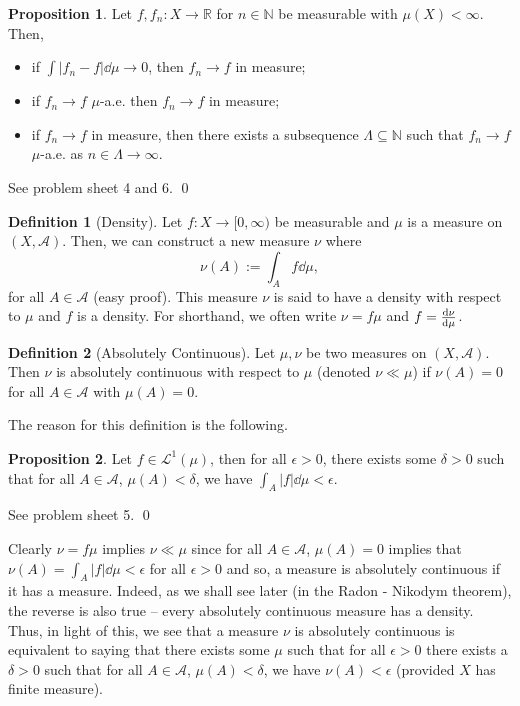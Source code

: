 \documentclass[
]{article}
\theoremstyle{definition}
\newtheorem{prop}{Proposition}
\theoremstyle{definition}
\newtheorem{definition}{Definition}[section]
\begin{document}
\begin{prop}
  Let \(f, f_n : X \to \mathbb{R}\) for \(n \in \mathbb{N}\) be measurable with 
  \(\mu(X) < \infty\). Then, 
  \begin{itemize}
    \item if \(\int |f_n - f| \dd \mu \to 0\), then \(f_n \to f\) in measure;
    \item if \(f_n \to f\) \(\mu\)-a.e. then \(f_n \to f\) in measure;
    \item if \(f_n \to f\) in measure, then there exists a subsequence 
    \(\Lambda \subseteq \mathbb{N}\) such that \(f_n \to f\) \(\mu\)-a.e. as 
    \(n \in \Lambda \to \infty\).
  \end{itemize}
\end{prop}
\proof

See problem sheet 4 and 6. \qed

\begin{definition}[Density]
  Let \(f : X \to [0, \infty)\) be measurable and \(\mu\) is a measure on 
  \((X, \mathcal{A})\). Then, we can construct a new measure \(\nu\) where 
  \[\nu(A) := \int_A f \dd \mu,\]
  for all \(A \in \mathcal{A}\) (easy proof). This measure \(\nu\) is said to have a 
  density with respect to \(\mu\) and \(f\) is a density. For shorthand, we often 
  write \(\nu = f \mu\) and \(f = \dv{\nu}{\mu}\).
\end{definition}

\begin{definition}[Absolutely Continuous]
  Let \(\mu, \nu\) be two measures on \((X, \mathcal{A})\). Then \(\nu\) is 
  absolutely continuous with respect to \(\mu\) (denoted \(\nu \ll \mu\)) if 
  \(\nu(A) = 0\) for all \(A \in \mathcal{A}\) with \(\mu(A) = 0\).
\end{definition}

The reason for this definition is the following.

\begin{prop}
  Let \(f \in \mathcal{L}^1(\mu)\), then for all \(\epsilon > 0\), there exists 
  some \(\delta > 0\) such that for all \(A \in \mathcal{A}\), \(\mu(A) < \delta\), 
  we have \(\int_A |f| \dd \mu < \epsilon\).
\end{prop}
\proof

See problem sheet 5. \qed

Clearly \(\nu = f\mu\) implies \(\nu \ll \mu\) since for all
\(A \in \mathcal{A}\), \(\mu(A) = 0\) implies that
\(\nu (A) = \int_A |f| \dd \mu < \epsilon\) for all \(\epsilon > 0\) and
so, a measure is absolutely continuous if it has a measure. Indeed, as
we shall see later (in the Radon - Nikodym theorem), the reverse is also
true -- every absolutely continuous measure has a density. Thus, in
light of this, we see that a measure \(\nu\) is absolutely continuous is
equivalent to saying that there exists some \(\mu\) such that for all
\(\epsilon > 0\) there exists a \(\delta > 0\) such that for all
\(A \in \mathcal{A}\), \(\mu(A) < \delta\), we have
\(\nu(A) < \epsilon\) (provided \(X\) has finite measure).
\end{document}
